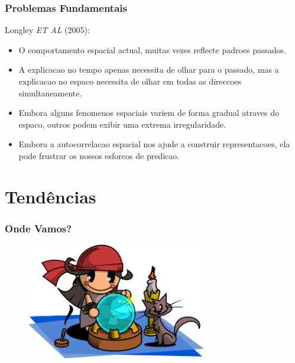 \documentclass[hyperref={pdfpagelabels=true}]{beamer}
\begin{document}
\begin{frame}
\frametitle{Problemas Fundamentais}

Longley \textit{ET AL} (2005):
\small{ 
      \begin{itemize} 
      \item<2->O comportamento espacial actual, muitas vezes reflecte padroes passados.%
        \item<3->A explicacao no tempo apenas necessita de olhar para o passado, mas a explicacao no espaco necessita de olhar em todas as direccoes simultaneamente.%
        \item<4->Embora alguns fenomenos espaciais variem de forma gradual atraves do espaco, outros podem exibir uma extrema irregularidade.%
        \item<5->Embora a autocorrelacao espacial nos ajude a construir representacoes, ela pode frustrar os nossos esforcos de predicao.%
      \end{itemize}                
}

\end{frame}


\section{Tend\^{e}ncias} 
\begin{frame}
\frametitle{Onde Vamos?}

    \begin{figure}   
         \includegraphics[width=0.7\textwidth]{fortune-teller.png}   
    \end{figure}     

\end{frame}
\end{document}
